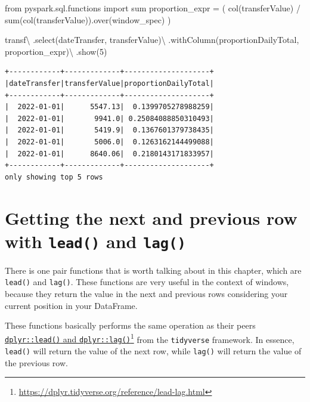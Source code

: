 \documentclass[
  11pt,
  letterpaper,
  DIV=11,
  numbers=noendperiod]{scrreprt}
\newenvironment{Shaded}{\begin{snugshade}}{\end{snugshade}}
\newcommand{\BuiltInTok}[1]{\textcolor[rgb]{0.00,0.23,0.31}{#1}}
\newcommand{\DecValTok}[1]{\textcolor[rgb]{0.68,0.00,0.00}{#1}}
\newcommand{\ImportTok}[1]{\textcolor[rgb]{0.00,0.46,0.62}{#1}}
\newcommand{\NormalTok}[1]{\textcolor[rgb]{0.00,0.23,0.31}{#1}}
\newcommand{\OperatorTok}[1]{\textcolor[rgb]{0.37,0.37,0.37}{#1}}
\newcommand{\StringTok}[1]{\textcolor[rgb]{0.13,0.47,0.30}{#1}}
\begin{document}
\begin{Shaded}
\begin{Highlighting}[]
\ImportTok{from}\NormalTok{ pyspark.sql.functions }\ImportTok{import} \BuiltInTok{sum}
\NormalTok{proportion\_expr }\OperatorTok{=}\NormalTok{ (}
\NormalTok{    col(}\StringTok{\textquotesingle{}transferValue\textquotesingle{}}\NormalTok{)}
    \OperatorTok{/} \BuiltInTok{sum}\NormalTok{(col(}\StringTok{\textquotesingle{}transferValue\textquotesingle{}}\NormalTok{)).over(window\_spec)}
\NormalTok{)}

\NormalTok{transf}\OperatorTok{\textbackslash{}}
\NormalTok{    .select(}\StringTok{\textquotesingle{}dateTransfer\textquotesingle{}}\NormalTok{, }\StringTok{\textquotesingle{}transferValue\textquotesingle{}}\NormalTok{)}\OperatorTok{\textbackslash{}}
\NormalTok{    .withColumn(}\StringTok{\textquotesingle{}proportionDailyTotal\textquotesingle{}}\NormalTok{, proportion\_expr)}\OperatorTok{\textbackslash{}}
\NormalTok{    .show(}\DecValTok{5}\NormalTok{)}
\end{Highlighting}
\end{Shaded}

\begin{verbatim}
+------------+-------------+--------------------+
|dateTransfer|transferValue|proportionDailyTotal|
+------------+-------------+--------------------+
|  2022-01-01|      5547.13|  0.1399705278988259|
|  2022-01-01|       9941.0| 0.25084088850310493|
|  2022-01-01|       5419.9|  0.1367601379738435|
|  2022-01-01|       5006.0|  0.1263162144499088|
|  2022-01-01|      8640.06|  0.2180143171833957|
+------------+-------------+--------------------+
only showing top 5 rows
\end{verbatim}

\section{\texorpdfstring{Getting the next and previous row with
\texttt{lead()} and
\texttt{lag()}}{Getting the next and previous row with lead() and lag()}}\label{getting-the-next-and-previous-row-with-lead-and-lag}

There is one pair functions that is worth talking about in this chapter,
which are \texttt{lead()} and \texttt{lag()}. These functions are very
useful in the context of windows, because they return the value in the
next and previous rows considering your current position in your
DataFrame.

These functions basically performs the same operation as their peers
\href{https://dplyr.tidyverse.org/reference/lead-lag.html}{\texttt{dplyr::lead()}
and \texttt{dplyr::lag()}}\footnote{\url{https://dplyr.tidyverse.org/reference/lead-lag.html}}
from the \texttt{tidyverse} framework. In essence, \texttt{lead()} will
return the value of the next row, while \texttt{lag()} will return the
value of the previous row.
\end{document}
